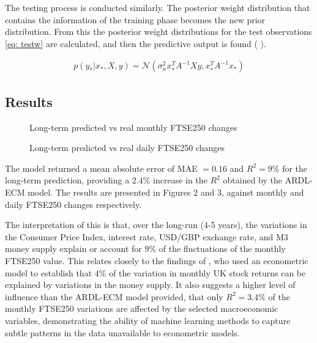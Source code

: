 \documentclass[11pt,a4paper]{article}
\newcommand{\citeboth}[1]{\citeauthor{#1} \citep{#1}}
\begin{document}
The testing process is conducted similarly. The 
posterior weight distribution that contains the information of the training phase becomes the new 
prior distribution. From this the posterior weight distributions for the test observations \eqref{eq: testw}
are calculated, and then the predictive output is found (\citeboth{rasmussen2006}).

\begin{align}
    p(y_{*}|x_{*}, X, y) = \mathcal{N}(\sigma_{n}^{2} x_{*}^{T}A^{-1}Xy, x_{*}^{T}A^{-1}x_{*}) \label{eq: testw}
\end{align}


\subsection{Results}


\begin{figure}[h!]
    \centering
      
    \caption{Long-term predicted vs real monthly FTSE250 changes}
    \label{fig:longmonthly}
\end{figure}

\begin{figure}[h!]
    \centering
      
    \caption{Long-term predicted vs real daily FTSE250 changes}
    \label{fig:longdaily}
\end{figure}

The model returned a mean absolute error of MAE $=0.16$ and 
$R^2 = 9\%$ for the long-term prediction, providing a 
$2.4\%$ increase in the $R^2$ obtained by the ARDL-ECM model. The results are presented 
in Figures 2 and 3, against monthly and daily FTSE250 changes respectively.

The interpretation of this is that, over the long-run (4-5 years), the variations in the 
Consumer Price Index, interest rate, USD/GBP exchange rate, and M3 money 
supply explain or account for $9\%$ of the fluctuations of the
monthly FTSE250 value. This relates closely to the findings of \citeboth{conover1999}, 
who used an econometric model to establish that $4\%$ of the variation in monthly UK stock returns can be 
explained by variations in the money supply. It also suggests a higher level of influence 
than the ARDL-ECM model provided, that only $R^2=3.4\%$ of the monthly FTSE250 variations 
are affected by the selected macroeconomic variables, demonstrating the ability of machine learning
methods to capture subtle patterns in the data unavailable to econometric models. 
\end{document}
